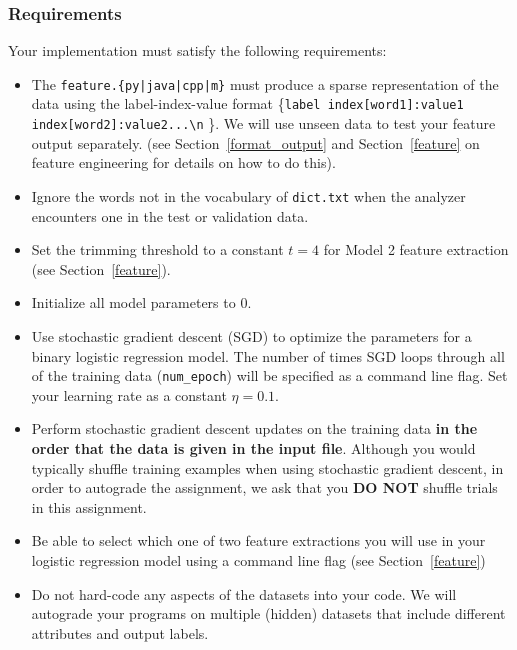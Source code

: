 \documentclass[11pt]{exam}
\numberwithin{equation}{section} %
\numberwithin{figure}{section} %
\numberwithin{table}{section} %
\begin{document}
\subsubsection{Requirements}
Your implementation must satisfy the following requirements:
\begin{itemize}
    \item The \texttt{feature.\{py|java|cpp|m\}} must produce a sparse representation of the data using the label-index-value format \{\lstinline{label index[word1]:value1  index[word2]:value2...\n} \}. We will use unseen data to test your feature output separately. (see Section~\ref{format_output} and Section~\ref{feature} on feature engineering for details on how to do this). 
    \item Ignore the words not in the vocabulary of \lstinline{dict.txt} when the analyzer encounters one in the test or validation data.
    \item Set the trimming threshold to a constant $t=4$ for Model 2 feature extraction (see Section~\ref{feature}). 
    \item Initialize all model parameters to $0$.
    \item Use stochastic gradient descent (SGD) to optimize the parameters for a binary logistic regression model. The number of times SGD loops through all of the training data (\texttt{num\_epoch}) will be specified as a command line flag. Set your learning rate as a constant  $\eta = 0.1$.
    \item Perform stochastic gradient descent updates on the training data \textbf{in the order that the data is given in the input file}. Although you would typically shuffle training examples when using stochastic gradient descent, in order to autograde the assignment, we ask that you {\bf DO NOT} shuffle trials in this assignment.
    \item Be able to select which one of two feature extractions you will use in your logistic regression model using a command line flag (see Section~\ref{feature})
    \item Do not hard-code any aspects of the datasets into your code. We will autograde your programs on multiple (hidden) datasets that include different attributes and output labels.
\end{itemize}
\end{document}
